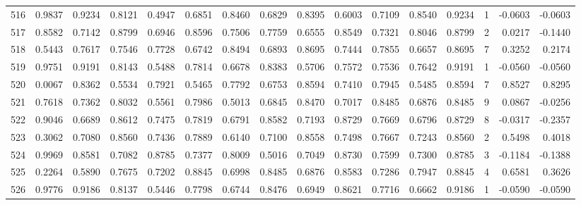 \begin{tabular}{lrrrrrrrrrrrrrrr}
516 &      0.9837 &  0.9234 &  0.8121 &  0.4947 &  0.6851 &  0.8460 &  0.6829 &  0.8395 &  0.6003 &  0.7109 &   0.8540 &     0.9234 &      1 &                   -0.0603 &                    -0.0603 \\
517 &      0.8582 &  0.7142 &  0.8799 &  0.6946 &  0.8596 &  0.7506 &  0.7759 &  0.6555 &  0.8549 &  0.7321 &   0.8046 &     0.8799 &      2 &                    0.0217 &                    -0.1440 \\
518 &      0.5443 &  0.7617 &  0.7546 &  0.7728 &  0.6742 &  0.8494 &  0.6893 &  0.8695 &  0.7444 &  0.7855 &   0.6657 &     0.8695 &      7 &                    0.3252 &                     0.2174 \\
519 &      0.9751 &  0.9191 &  0.8143 &  0.5488 &  0.7814 &  0.6678 &  0.8383 &  0.5706 &  0.7572 &  0.7536 &   0.7642 &     0.9191 &      1 &                   -0.0560 &                    -0.0560 \\
520 &      0.0067 &  0.8362 &  0.5534 &  0.7921 &  0.5465 &  0.7792 &  0.6753 &  0.8594 &  0.7410 &  0.7945 &   0.5485 &     0.8594 &      7 &                    0.8527 &                     0.8295 \\
521 &      0.7618 &  0.7362 &  0.8032 &  0.5561 &  0.7986 &  0.5013 &  0.6845 &  0.8470 &  0.7017 &  0.8485 &   0.6876 &     0.8485 &      9 &                    0.0867 &                    -0.0256 \\
522 &      0.9046 &  0.6689 &  0.8612 &  0.7475 &  0.7819 &  0.6791 &  0.8582 &  0.7193 &  0.8729 &  0.7669 &   0.6796 &     0.8729 &      8 &                   -0.0317 &                    -0.2357 \\
523 &      0.3062 &  0.7080 &  0.8560 &  0.7436 &  0.7889 &  0.6140 &  0.7100 &  0.8558 &  0.7498 &  0.7667 &   0.7243 &     0.8560 &      2 &                    0.5498 &                     0.4018 \\
524 &      0.9969 &  0.8581 &  0.7082 &  0.8785 &  0.7377 &  0.8009 &  0.5016 &  0.7049 &  0.8730 &  0.7599 &   0.7300 &     0.8785 &      3 &                   -0.1184 &                    -0.1388 \\
525 &      0.2264 &  0.5890 &  0.7675 &  0.7202 &  0.8845 &  0.6998 &  0.8485 &  0.6876 &  0.8583 &  0.7286 &   0.7947 &     0.8845 &      4 &                    0.6581 &                     0.3626 \\
526 &      0.9776 &  0.9186 &  0.8137 &  0.5446 &  0.7798 &  0.6744 &  0.8476 &  0.6949 &  0.8621 &  0.7716 &   0.6662 &     0.9186 &      1 &                   -0.0590 &                    -0.0590 \\

\end{tabular}
